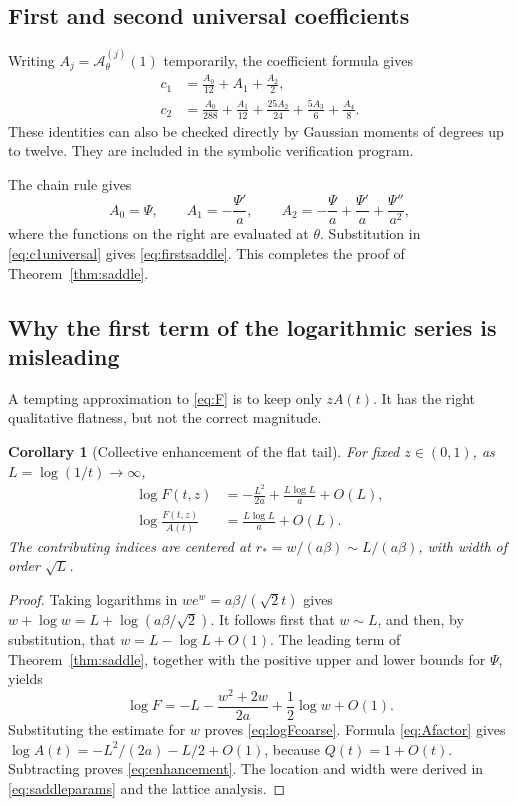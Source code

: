 \documentclass[11pt,oneside]{article}
\numberwithin{equation}{section}
\newtheorem{corollary}[theorem]{Corollary}
\theoremstyle{definition}
\theoremstyle{remark}
\begin{document}
\subsection{First and second universal coefficients}
Writing \(A_j=\mathcal A_\theta^{(j)}(1)\) temporarily, the coefficient
formula gives
\begin{align}
 c_1&=\frac{A_0}{12}+A_1+\frac{A_2}{2},
 \label{eq:c1universal}\\
 c_2&=\frac{A_0}{288}+\frac{A_1}{12}
            +\frac{25A_2}{24}+\frac{5A_3}{6}+\frac{A_4}{8}.
 \label{eq:c2universal}
\end{align}
These identities can also be checked directly by Gaussian moments of degrees
up to twelve. They are included in the symbolic verification program.

The chain rule gives
\begin{equation}
 A_0=\Psi,\qquad A_1=-\frac{\Psi'}a,\qquad
 A_2=-\frac\Psi a+\frac{\Psi'}a+\frac{\Psi''}{a^2},
 \label{eq:Aderivatives}
\end{equation}
where the functions on the right are evaluated at \(\theta\). Substitution
in \eqref{eq:c1universal} gives \eqref{eq:firstsaddle}. This completes the
proof of Theorem~\ref{thm:saddle}.

\subsection{Why the first term of the logarithmic series is misleading}
A tempting approximation to \eqref{eq:F} is to keep only \(zA(t)\). It has
the right qualitative flatness, but not the correct magnitude.

\begin{corollary}[Collective enhancement of the flat tail]
\label{cor:enhancement}
For fixed \(z\in(0,1)\), as \(L=\log(1/t)\to\infty\),
\begin{align}
 \log F(t,z)&=-\frac{L^2}{2a}+\frac{L\log L}{a}+O(L),
 \label{eq:logFcoarse}\\
 \log\frac{F(t,z)}{A(t)}&=\frac{L\log L}{a}+O(L).
 \label{eq:enhancement}
\end{align}
The contributing indices are centered at
\(r_*=w/(a\beta)\sim L/(a\beta)\), with width of order \(\sqrt L\).
\end{corollary}
\begin{proof}
Taking logarithms in \(we^w=a\beta/(\sqrt2t)\) gives
\(w+\log w=L+\log(a\beta/\sqrt2)\). It follows first that \(w\sim L\),
and then, by substitution, that \(w=L-\log L+O(1)\).
The leading term of Theorem~\ref{thm:saddle}, together with the positive
upper and lower bounds for \(\Psi\), yields
\[
 \log F=-L-\frac{w^2+2w}{2a}+\frac12\log w+O(1).
\]
Substituting the estimate for \(w\) proves \eqref{eq:logFcoarse}.
Formula \eqref{eq:Afactor} gives
\(\log A(t)=-L^2/(2a)-L/2+O(1)\), because \(Q(t)=1+O(t)\).
Subtracting proves \eqref{eq:enhancement}. The location and width were derived
in \eqref{eq:saddleparams} and the lattice analysis.
\end{proof}
\end{document}
